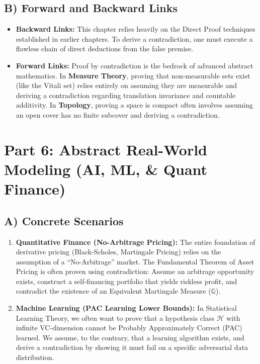 \documentclass[11pt, letterpaper]{article}
\theoremstyle{remark}
\begin{document}
\subsection{B) Forward and Backward Links}
\begin{itemize}
    \item \textbf{Backward Links:} This chapter relies heavily on the Direct Proof techniques established in earlier chapters. To derive a contradiction, one must execute a flawless chain of direct deductions from the false premise.
    \item \textbf{Forward Links:} Proof by contradiction is the bedrock of advanced abstract mathematics. In \textbf{Measure Theory}, proving that non-measurable sets exist (like the Vitali set) relies entirely on assuming they are measurable and deriving a contradiction regarding translation invariance and countable additivity. In \textbf{Topology}, proving a space is compact often involves assuming an open cover has no finite subcover and deriving a contradiction.
\end{itemize}

\newpage
\section{Part 6: Abstract Real-World Modeling (AI, ML, \& Quant Finance)}

\subsection{A) Concrete Scenarios}
\begin{enumerate}
    \item \textbf{Quantitative Finance (No-Arbitrage Pricing):} The entire foundation of derivative pricing (Black-Scholes, Martingale Pricing) relies on the assumption of a ``No-Arbitrage'' market. The Fundamental Theorem of Asset Pricing is often proven using contradiction: Assume an arbitrage opportunity exists, construct a self-financing portfolio that yields riskless profit, and contradict the existence of an Equivalent Martingale Measure ($\mathbb{Q}$).
    \item \textbf{Machine Learning (PAC Learning Lower Bounds):} In Statistical Learning Theory, we often want to prove that a hypothesis class $\mathcal{H}$ with infinite VC-dimension cannot be Probably Approximately Correct (PAC) learned. We assume, to the contrary, that a learning algorithm exists, and derive a contradiction by showing it must fail on a specific adversarial data distribution.
\end{enumerate}
\end{document}
